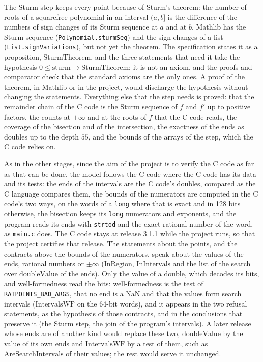 The Sturm step keeps every point because of Sturm's theorem: the number of roots of a squarefree
polynomial in an interval $(a, b]$ is the difference of the numbers of sign changes of its Sturm
sequence at $a$ and at $b$. Mathlib has the Sturm sequence (\verb|Polynomial.sturmSeq|) and the sign
changes of a list (\verb|List.signVariations|), but not yet the theorem. The specification states it
as a proposition, $\mathrm{SturmTheorem}$, and the three statements that need it take the hypothesis
$0 \le \mathrm{sturm} \to \mathrm{SturmTheorem}$; it is not an axiom, and the proofs and comparator
check that the standard axioms are the only ones. A proof of the theorem, in Mathlib or in the
project, would discharge the hypothesis without changing the statements. Everything else that the
step needs is proved: that the remainder chain of the C code is the Sturm sequence of $f$ and $f'$
up to positive factors, the counts at $\pm\infty$ and at the roots of $f$ that the C code reads, the
coverage of the bisection and of the intersection, the exactness of the ends as doubles up to the
depth $55$, and the bounds of the arrays of the step, which the C code relies on.

As in the other stages, since the aim of the project is to verify the C code as far as that can be
done, the model follows the C code where the C code has its data and its tests: the ends of the
intervals are the C code's doubles, compared as the C language compares them, the bounds of the
numerators are computed in the C code's two ways, on the words of a \verb|long| where that is exact
and in 128 bits otherwise, the bisection keeps its \verb|long| numerators and exponents, and the
program reads its ends with \verb|strtod| and the exact rational number of the word, as
\verb|main.c| does. The C code stays at release 3.1.1 while the project runs, so that the project
certifies that release. The statements about the points, and the contracts above the bounds of the
numerators, speak about the values of the ends, rational numbers or $\pm\infty$
($\mathrm{InRegion}$, $\mathrm{InIntervals}$ and the list of the search over $\mathrm{doubleValue}$
of the ends). Only the value of a double, which decodes its bits, and well-formedness read the bits:
well-formedness is the test of \verb|RATPOINTS_BAD_ARGS|, that no end is a NaN and that the values
form search intervals ($\mathrm{IntervalsWF}$ on the $64$-bit words), and it appears in the two
refusal statements, as the hypothesis of those contracts, and in the conclusions that preserve it
(the Sturm step, the join of the program's intervals). A later release whose ends are of another
kind would replace these two, $\mathrm{doubleValue}$ by the value of its own ends and
$\mathrm{IntervalsWF}$ by a test of them, such as $\mathrm{AreSearchIntervals}$ of their values; the
rest would serve it unchanged.

